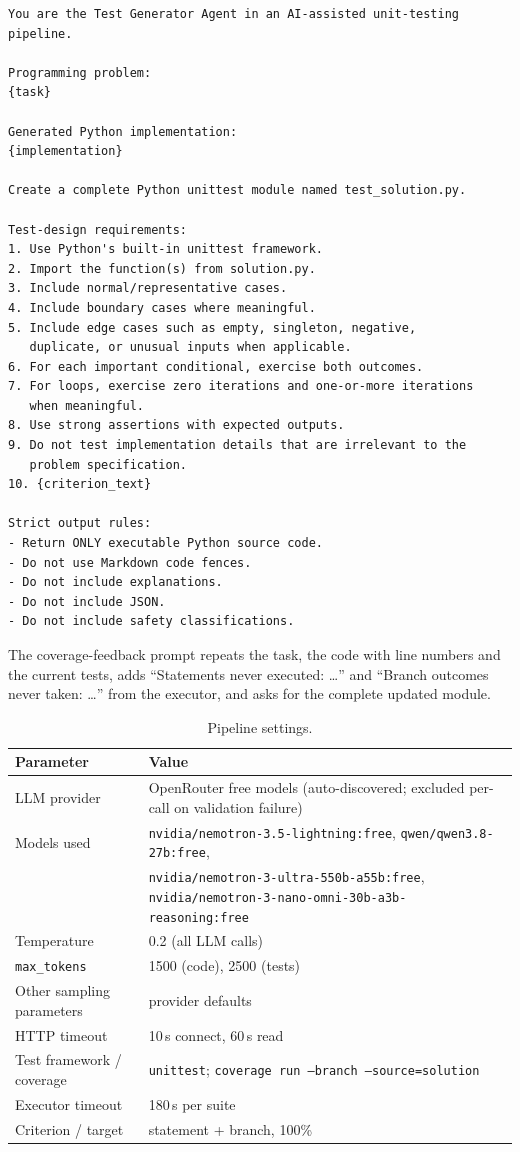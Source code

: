 \documentclass[11pt,a4paper]{article}
\begin{document}
\begin{lstlisting}[caption={Test Generator prompt. Item 10 depends on the chosen criterion; for \texttt{statement+branch} it is ``Aim for high statement and branch coverage.''}]
You are the Test Generator Agent in an AI-assisted unit-testing pipeline.

Programming problem:
{task}

Generated Python implementation:
{implementation}

Create a complete Python unittest module named test_solution.py.

Test-design requirements:
1. Use Python's built-in unittest framework.
2. Import the function(s) from solution.py.
3. Include normal/representative cases.
4. Include boundary cases where meaningful.
5. Include edge cases such as empty, singleton, negative,
   duplicate, or unusual inputs when applicable.
6. For each important conditional, exercise both outcomes.
7. For loops, exercise zero iterations and one-or-more iterations
   when meaningful.
8. Use strong assertions with expected outputs.
9. Do not test implementation details that are irrelevant to the
   problem specification.
10. {criterion_text}

Strict output rules:
- Return ONLY executable Python source code.
- Do not use Markdown code fences.
- Do not include explanations.
- Do not include JSON.
- Do not include safety classifications.
\end{lstlisting}

The coverage-feedback prompt repeats the task, the code with line numbers and the
current tests, adds ``Statements never executed: \ldots'' and ``Branch outcomes never
taken: \ldots'' from the executor, and asks for the complete updated module.

\begin{table}[H]
\centering\small
\begin{tabularx}{\linewidth}{l X}
\toprule
Parameter & Value\\
\midrule
LLM provider & OpenRouter free models (auto-discovered; excluded per-call on validation failure)\\
Models used & \texttt{nvidia/nemotron-3.5-lightning:free}, \texttt{qwen/qwen3.8-27b:free},\\
            & \texttt{nvidia/nemotron-3-ultra-550b-a55b:free}, \texttt{nvidia/nemotron-3-nano-omni-30b-a3b-reasoning:free}\\
Temperature & 0.2 (all LLM calls)\\
\texttt{max\_tokens} & 1500 (code), 2500 (tests)\\
Other sampling parameters & provider defaults\\
HTTP timeout & 10\,s connect, 60\,s read\\
Test framework / coverage & \texttt{unittest}; \texttt{coverage run --branch --source=solution}\\
Executor timeout & 180\,s per suite\\
Criterion / target & statement + branch, 100\%\\
\bottomrule
\end{tabularx}
\caption{Pipeline settings.}
\end{table}
\end{document}
